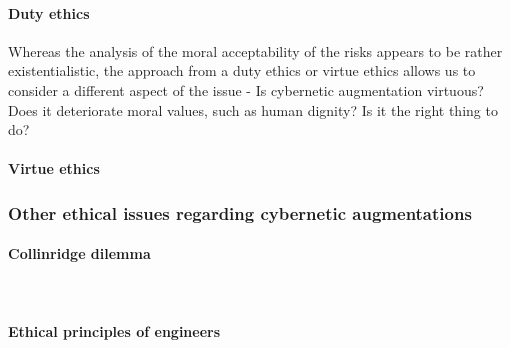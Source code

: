 

\paragraph{Duty ethics}

Whereas the analysis of the moral acceptability of the risks appears to be rather existentialistic, the approach from a duty ethics or virtue ethics allows us to consider a different aspect of the issue - Is cybernetic augmentation virtuous? Does it deteriorate moral values, such as human dignity? Is it the right thing to do? 

\paragraph{Virtue ethics}



\subsubsection{Other ethical issues regarding cybernetic augmentations}

\paragraph{Collinridge dilemma} \\

\paragraph{Ethical principles of engineers} \\

